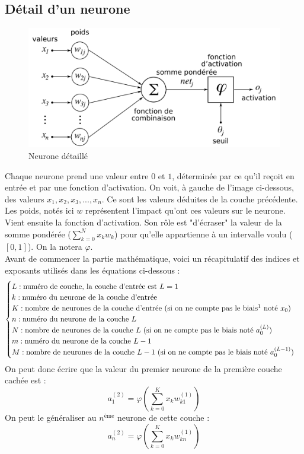 \subsection{Détail d'un neurone}
	
	\begin{figure}
		\centering
		\includegraphics[width=.75\linewidth]{images/neurone}
		\caption{Neurone détaillé}
	\end{figure}

	Chaque neurone prend une valeur entre $0$ et $1$, déterminée par ce qu'il reçoit en entrée et par une fonction d'activation. On voit, à gauche de l'image ci-dessous, des valeurs $x_1, x_2, x_3, ..., x_n$. Ce sont les valeurs déduites de la couche précédente. Les poids, notés ici $w$ représentent l'impact qu'ont ces valeurs sur le neurone. Vient ensuite la fonction d'activation. Son rôle est "d'écraser" la valeur de la somme pondérée ($\sum_{k=0}^{N}x_kw_{k}$) pour qu'elle appartienne à un intervalle voulu ($[0, 1]$). On la notera $\varphi$.\\
	
	Avant de commencer la partie mathématique, voici un récapitulatif des indices et exposants utilisés dans les équations ci-dessous :
	$$
	\begin{cases}
		L : \text{numéro de couche, la couche d'entrée est $L = 1$}\\
		k : \text{numéro du neurone de la couche d'entrée}\\
		K : \text{nombre de neurones de la couche d'entrée (si on ne compte pas le biais\footnotemark \ noté $x_0$)}\\
		n : \text{numéro du neurone de la couche $L$}\\
		N : \text{nombre de neurones de la couche $L$ (si on ne compte pas le biais noté $a_0^{(L)}$)}\\
		m : \text{numéro du neurone de la couche $L-1$}\\
		M : \text{nombre de neurones de la couche $L-1$ (si on ne compte pas le biais noté $a_0^{(L-1)}$)}
	\end{cases}
	$$
	On peut donc écrire que la valeur du premier neurone de la première couche cachée est : 
	$$a_1^{(2)} = \varphi\left(\sum_{k=0}^{K}x_kw_{k1}^{(1)}\right)$$
	On peut le généraliser au $n^{\text{ème}}$ neurone de cette couche :
	$$a_n^{(2)} = \varphi\left(\sum_{k=0}^{K}x_kw_{kn}^{(1)}\right)$$
	
